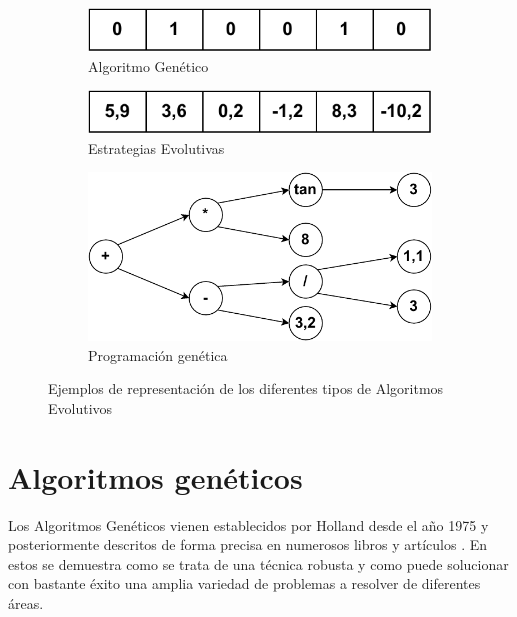 \begin{figure}[h!]
\centering
    \begin{subfigure}{0.51\textwidth}
        \includegraphics[width=\textwidth]{figuras/desarrollo teorico/Algoritmo_Evolutivo-ej_AE.pdf} 
        \caption{Algoritmo Genético}
        \label{fig:ej_AG}
    \end{subfigure}
    \begin{subfigure}{0.51\textwidth}
        \includegraphics[width=\textwidth]{figuras/desarrollo teorico/Algoritmo_Evolutivo-ej_EE.pdf}
        \caption{Estrategias Evolutivas}
        \label{fig:ej_EE}
    \end{subfigure}
    \begin{subfigure}{0.65\textwidth}
        \includegraphics[width=\textwidth]{figuras/desarrollo teorico/Algoritmo_Evolutivo-ej_PG.pdf}
        \caption{Programación genética}
        \label{fig:ej_PG}
    \end{subfigure}
\caption{Ejemplos de representación de los diferentes tipos de Algoritmos Evolutivos}
\label{fig:ej_AE}
\end{figure}

\section{Algoritmos genéticos}

Los Algoritmos Genéticos vienen establecidos por Holland desde el año 1975 \cite{Holland1984} y posteriormente descritos de forma precisa en numerosos libros y artículos \cite{GoldbergDavidE.DavidEdward1989Gais}. En estos se demuestra como se trata de una técnica robusta y como puede solucionar con bastante éxito una amplia variedad de problemas a resolver de diferentes áreas.

